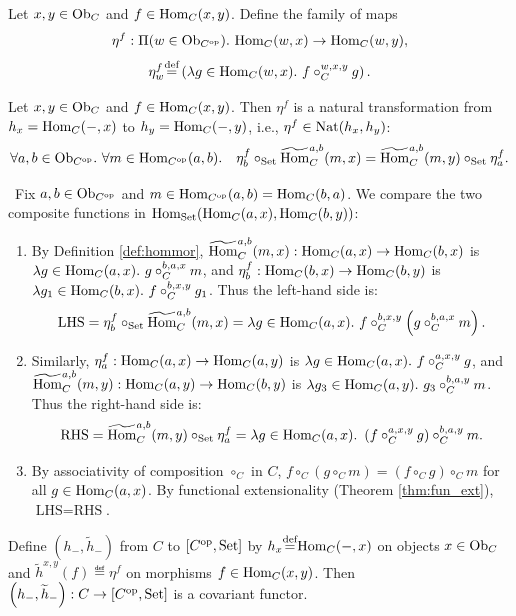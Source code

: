 \documentclass[10pt,a4paper]{article}
\begin{document}
\begin{definition}
Let $x, y \in {\textrm{Ob}}_C$ and $f \in {\textrm{Hom}}_C(x,y)$. Define the family of maps
$$\eta^f : \Pi(w\in \Ob_{C^\op}).\ \Hom_C(w,x)\to \Hom_C(w,y),$$
$$\eta^f_w \eqdef \left(\lambda g\in\Hom_C(w,x).\ f\circ_C^{w,x,y} g\right).$$
\end{definition}

\begin{lemma}\label{lem:eta_nat}
Let $x,y \in {\textrm{Ob}}_C$ and $f \in {\textrm{Hom}}_C(x,y)$. Then $\eta^f$ is a natural transformation from $h_x = {\textrm{Hom}}_C(-,x)$ to $h_y = {\textrm{Hom}}_C(-,y)$, i.e., $\eta^f \in {\textrm{Nat}}(h_x, h_y)$:
$$\forall a,b\in {\textrm{Ob}}_{C^{\textrm{op}}}.\ \forall m\in {\textrm{Hom}}_{C^{\textrm{op}}}(a,b).\quad \eta^f_b \circ_{\textrm{Set}} {\widetilde{{\textrm{Hom}}}\textrm{}}_C^{a,b}(m,x) = {\widetilde{{\textrm{Hom}}}\textrm{}}_C^{a,b}(m,y)\circ_{\textrm{Set}}\eta^f_a.$$
\end{lemma}
\myprf\ Fix $a, b \in {\textrm{Ob}}_{C^{\textrm{op}}}$ and $m \in {\textrm{Hom}}_{C^{\textrm{op}}}(a,b) = {\textrm{Hom}}_C(b,a)$. We compare the two composite functions in ${\textrm{Hom}}_{\textrm{Set}}({\textrm{Hom}}_C(a,x), {\textrm{Hom}}_C(b,y))$:
\begin{enumerate}
\item By Definition \ref{def:hommor}, ${\widetilde{{\textrm{Hom}}}\textrm{}}_C^{a,b}(m,x) : {\textrm{Hom}}_C(a,x) \to {\textrm{Hom}}_C(b,x)$ is $\lambda g \in {\textrm{Hom}}_C(a,x).\ g \circ_C^{b,a,x} m$, and $\eta^f_b : {\textrm{Hom}}_C(b,x) \to {\textrm{Hom}}_C(b,y)$ is $\lambda g_1 \in {\textrm{Hom}}_C(b,x).\ f \circ_C^{b,x,y} g_1$. Thus the left-hand side is:
$$\textrm{LHS} = \eta^f_b \circ_{\textrm{Set}} {\widetilde{{\textrm{Hom}}}\textrm{}}_C^{a,b}(m,x) = \lambda g \in {\textrm{Hom}}_C(a,x).\ f \circ_C^{b,x,y} \left(g \circ_C^{b,a,x} m\right).$$
\item Similarly, $\eta^f_a : {\textrm{Hom}}_C(a,x) \to {\textrm{Hom}}_C(a,y)$ is $\lambda g \in {\textrm{Hom}}_C(a,x).\ f \circ_C^{a,x,y} g$, and ${\widetilde{{\textrm{Hom}}}\textrm{}}_C^{a,b}(m,y) : {\textrm{Hom}}_C(a,y) \to {\textrm{Hom}}_C(b,y)$ is $\lambda g_3 \in {\textrm{Hom}}_C(a,y).\ g_3 \circ_C^{b,a,y} m$. Thus the right-hand side is:
$$\textrm{RHS} = {\widetilde{{\textrm{Hom}}}\textrm{}}_C^{a,b}(m,y) \circ_{\textrm{Set}} \eta^f_a = \lambda g \in {\textrm{Hom}}_C(a,x).\ \left(f \circ_C^{a,x,y} g\right) \circ_C^{b,a,y} m.$$
\item By associativity of composition $\circ_C$ in $C$, $f \circ_C (g \circ_C m) = (f \circ_C g) \circ_C m$ for all $g \in {\textrm{Hom}}_C(a,x)$. By functional extensionality (Theorem \ref{thm:fun_ext}), $\textrm{LHS} = \textrm{RHS}$.
\end{enumerate}
\myqed
\begin{lemma}\label{lem:yoneda_functor}
Define $\left(h_-, \widetilde{h}_-\right)$ from $C$ to $[C^{\textrm{op}}, {\textrm{Set}}]$ by $h_x {\stackrel{{\textrm{def}}}{=}} {\textrm{Hom}}_C(-,x)$ on objects $x \in {\textrm{Ob}}_C$ and $\widetilde{h}^{x,y}(f) \eqdef \eta^f$ on morphisms $f \in {\textrm{Hom}}_C(x,y)$. Then $\left(h_-, \widetilde{h}_-\right) : C \to [C^{\textrm{op}}, {\textrm{Set}}]$ is a covariant functor.
\end{lemma}
\end{document}
